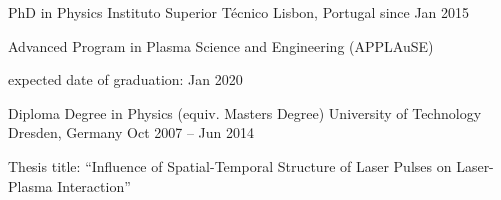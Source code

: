 \begin{cventries}
  \cventry
    {PhD in Physics} %
    {Instituto Superior Técnico} %
    {Lisbon, Portugal} %
    {since Jan 2015} %
    {
      \begin{cvitems} %
        \item[] Advanced Program in Plasma Science and Engineering (APPLAuSE)
        \item[] expected date of graduation: Jan 2020
      \end{cvitems}
    }

  \cventry
    {Diploma Degree in Physics (equiv. Masters Degree)} %
    {University of Technology} %
    {Dresden, Germany} %
    {Oct 2007 -- Jun 2014} %
    {
      \begin{cvitems} %
        \item[] Thesis title: ``Influence of Spatial-Temporal Structure of Laser Pulses
                on Laser-Plasma Interaction''
      \end{cvitems}
    }
\end{cventries}
